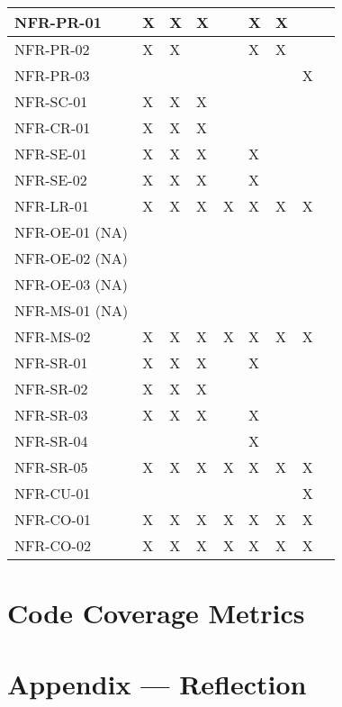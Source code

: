 \documentclass[12pt, titlepage]{article}
\begin{document}
\begin{longtable}{|p{3.5cm}|p{1cm}|p{1cm}|p{1cm}|p{1cm}|p{1cm}|p{1cm}|p{1cm}|p{1cm}}
    NFR-PR-01  & X & X & X &  & X & X &  \\\hline
    NFR-PR-02  & X & X &  &  & X & X &  \\\hline
    NFR-PR-03  &  &  &  &  &  &  & X \\\hline
    NFR-SC-01  & X & X & X &  &  &  &  \\\hline
    NFR-CR-01  & X & X & X &  &  &  &  \\\hline
    NFR-SE-01  & X & X & X &  & X &  &  \\\hline
    NFR-SE-02  & X & X & X &  & X &  &  \\\hline
    NFR-LR-01  & X & X & X & X & X & X & X \\\hline
    NFR-OE-01 (NA) &  &  &  &  &  &  &  \\\hline
    NFR-OE-02  (NA) &  &  &  &  &  &  &  \\\hline
    NFR-OE-03  (NA) &  &  &  &  &  &  &  \\\hline
    NFR-MS-01 (NA) &  &  &  &  &  &  &  \\\hline
    NFR-MS-02  & X & X & X & X & X & X & X \\\hline
    NFR-SR-01  & X & X & X &  & X &  &  \\\hline
    NFR-SR-02  & X & X & X &  &  &  &  \\\hline
    NFR-SR-03  & X & X & X &  & X &  &  \\\hline
    NFR-SR-04  &  &  &  &  & X &  &  \\\hline
    NFR-SR-05  & X & X & X & X & X & X & X \\\hline
    NFR-CU-01  &  &  &  &  &  &  & X \\\hline
    NFR-CO-01  & X & X & X & X & X & X & X \\\hline
    NFR-CO-02  & X & X & X & X & X & X & X \\\hline
    
    \hline
\end{longtable}

\section{Code Coverage Metrics}




\newpage{}
\section*{Appendix --- Reflection}
\end{document}
